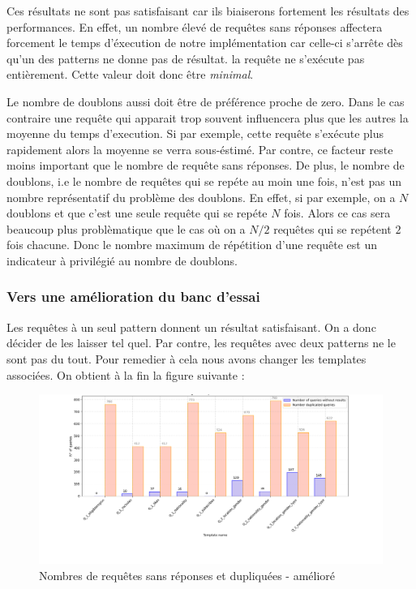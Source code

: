 \documentclass[12pt,titlepage]{article}
\begin{document}
Ces résultats ne sont pas satisfaisant car ils biaiserons fortement les résultats des performances. En effet, un nombre élevé de requêtes sans réponses affectera forcement le temps d'éxecution de notre implémentation car celle-ci s'arrête dès qu'un des patterns ne donne pas de résultat. la requête ne s'exécute pas entièrement. Cette valeur doit donc être \textit{minimal}.

Le nombre de doublons aussi doit être de préférence proche de zero. Dans le cas contraire une requête qui apparait trop souvent influencera plus que les autres la moyenne du temps d'execution. Si par exemple, cette requête s'exécute plus rapidement alors la moyenne se verra sous-éstimé. Par contre, ce facteur reste moins important que le nombre de requête sans réponses. De plus, le nombre de doublons, i.e le nombre de requêtes qui se repéte au moin une fois, n'est pas un nombre représentatif du problème des doublons. En effet, si par exemple, on a $N$ doublons et que c'est une seule requête qui se repéte $N$ fois. Alors ce cas sera beaucoup plus problèmatique que le cas où on a $N/2$ requêtes qui se repétent $2$ fois chacune. Donc le nombre maximum de répétition d'une requête est un indicateur à privilégié au nombre de doublons.

\subsubsection{Vers une amélioration du banc d'essai}

Les requêtes à un seul pattern donnent un résultat satisfaisant. On a donc décider de les laisser tel quel. Par contre, les requêtes avec deux patterns ne le sont pas du tout. Pour remedier à cela nous avons changer les templates associées. On obtient à la fin la figure suivante : 

\begin{figure}[!h]
  \centering
  \includegraphics[width=1.\textwidth]{img/zero_dup_per_template_ameliore.png}
  \caption{Nombres de requêtes sans réponses et dupliquées - amélioré}
  \label{zerodup2}
\end{figure}
\end{document}
